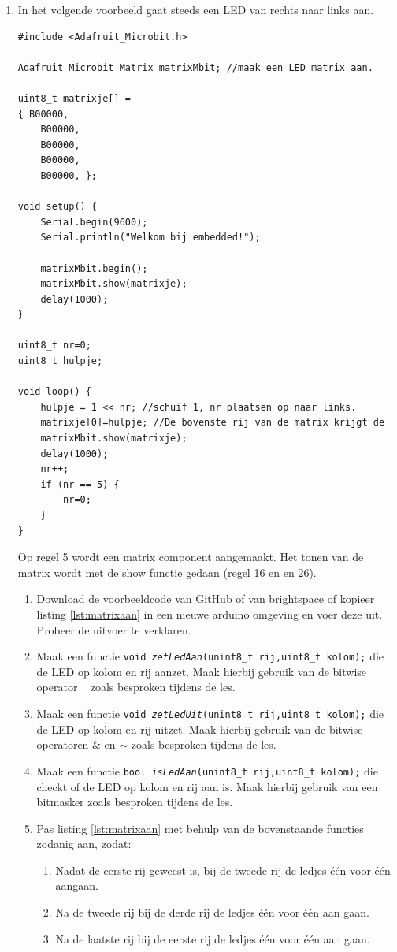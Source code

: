 \begin{enumerate}
\item In het volgende voorbeeld gaat steeds een LED van rechts naar links aan.

\begin{lstlisting}[caption={Looplicht van de bovenste rij.},label={lst:matrixaan2}]
#include <Adafruit_Microbit.h>

Adafruit_Microbit_Matrix matrixMbit; //maak een LED matrix aan.

uint8_t matrixje[] =
{ B00000,
	B00000,
	B00000,
	B00000,
	B00000, };

void setup() {
	Serial.begin(9600);
	Serial.println("Welkom bij embedded!");

    matrixMbit.begin();
	matrixMbit.show(matrixje);
	delay(1000);  
}

uint8_t nr=0;
uint8_t hulpje;

void loop() {
	hulpje = 1 << nr; //schuif 1, nr plaatsen op naar links.
	matrixje[0]=hulpje; //De bovenste rij van de matrix krijgt de 
	matrixMbit.show(matrixje);
	delay(1000);
	nr++;
	if (nr == 5) {
	    nr=0;
	}        
}
\end{lstlisting}
Op regel 5 wordt een matrix component aangemaakt. Het tonen van de matrix wordt met de show functie gedaan (regel 16 en en 26).

\begin{enumerate}
	\item Download de  \href{https://github.com/JohnVi-hhs/embsysP/tree/main/voorbeelden/matrixloopl.ino}{voorbeeldcode van GitHub} of van brightspace of kopieer listing \ref{lst:matrixaan} in een nieuwe arduino omgeving en voer deze uit.\\
	Probeer de uitvoer te verklaren.

\item Maak een functie \texttt{void \textit{zetLedAan}(unint8\_t rij,uint8\_t kolom);} die de LED op kolom en rij aanzet. Maak hierbij gebruik van de bitwise operator \textbar ~ zoals besproken tijdens de les.
\item Maak een functie \texttt{void \textit{zetLedUit}(unint8\_t rij,uint8\_t kolom);} die de LED op kolom en rij uitzet. Maak hierbij gebruik van de bitwise operatoren \& en $\sim$ zoals besproken tijdens de les.
\item Maak een functie \texttt{bool \textit{isLedAan}(unint8\_t rij,uint8\_t kolom);} die checkt of de LED op kolom en rij aan is. Maak hierbij gebruik van een bitmasker zoals besproken tijdens de les.

	\item Pas listing \ref{lst:matrixaan} met behulp van de bovenstaande functies zodanig aan, zodat:
\begin{enumerate}%
	\item Nadat de eerste rij geweest is, bij de tweede rij de ledjes \'{e}\'{e}n voor \'{e}\'{e}n  aangaan. 
	\item Na de tweede rij bij de derde rij de ledjes \'{e}\'{e}n voor \'{e}\'{e}n  aan gaan. 
	\item Na de laatste rij bij de eerste rij de ledjes \'{e}\'{e}n voor \'{e}\'{e}n  aan gaan. 
\end{enumerate}


\end{enumerate}
\end{enumerate}
